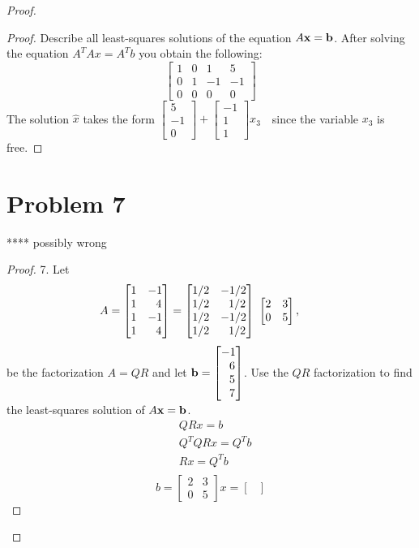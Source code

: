 \documentclass[12pt]{article}
\newcommand{\sect}[1]{\section*{#1}}
\begin{document}
\begin{proof}
\begin{proof}
     Describe all
    least-squares solutions of the equation $A{\bf x} = {\bf b}$.
    \vskip 10pt
    After solving the equation $A^TAx=A^Tb$ you obtain the following:
    \[
      \begin{bmatrix}
        1&0&1&5\\0&1&-1&-1\\0&0&0&0
      \end{bmatrix}
    \]
    The solution $\hat{x}$ takes the form $\begin{bmatrix}
      5\\-1\\0
  \end{bmatrix}+\begin{bmatrix}
    -1\\1\\1
  \end{bmatrix}x_3\text{ }$  since the variable $x_3$ is free.
\end{proof}
\sect{Problem 7}**** possibly wrong
\begin{proof}
  7. Let
  \[
  A = \begin{bmatrix}1 & -1 \\1 & ~~4\\1 & -1\\1 & ~~4\end{bmatrix} = \begin{bmatrix} 1/2 & -1/2\\ 1/2 & ~~1/2 \\1/2 & - 1/2 \\1/2 & ~~1/2\end{bmatrix}~\begin{bmatrix}2 & 3\\0 & 5\end{bmatrix},\hskip 20pt
  \]
  be the factorization $A = QR$ and let ${\bf b} = \begin{bmatrix} -1\\~~6\\~~5\\~~7\end{bmatrix}$.
  Use the $QR$ factorization to find the least-squares solution of $A{\bf x} = {\bf b}$.
  \begin{align*}
    &QRx=b\\
    &Q^TQRx=Q^Tb\\
    &Rx=Q^Tb\\
  \end{align*}
  \[
  \renewcommand{\arraystretch}{2}
    b=\begin{bmatrix}2 & 3\\0 & 5\end{bmatrix}x=\begin{bmatrix}

\end{bmatrix}\]
\end{proof}
\end{proof}
\end{document}
